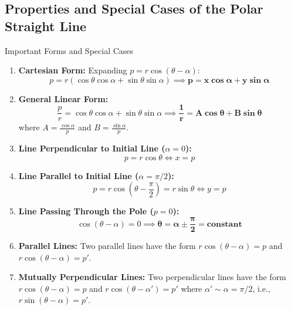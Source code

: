 \documentclass[11pt,a4paper]{article}
\begin{document}
\newpage

\subsection{Properties and Special Cases of the Polar Straight Line}

\begin{formulabox}{Important Forms and Special Cases}
\begin{enumerate}
    \item \textbf{Cartesian Form:} Expanding $p = r\cos(\theta - \alpha)$:
    \begin{equation}
        p = r(\cos\theta\cos\alpha + \sin\theta\sin\alpha) \implies \mathbf{p = x\cos\alpha + y\sin\alpha}
    \end{equation}
    
    \item \textbf{General Linear Form:}
    \begin{equation}
        \frac{p}{r} = \cos\theta\cos\alpha + \sin\theta\sin\alpha \implies \mathbf{\frac{1}{r} = A\cos\theta + B\sin\theta}
    \end{equation}
    where $A = \frac{\cos\alpha}{p}$ and $B = \frac{\sin\alpha}{p}$.
    
    \item \textbf{Line Perpendicular to Initial Line ($\alpha = 0$):}
    \begin{equation}
        p = r\cos\theta \iff x = p
    \end{equation}
    
    \item \textbf{Line Parallel to Initial Line ($\alpha = \pi/2$):}
    \begin{equation}
        p = r\cos\left(\theta - \frac{\pi}{2}\right) = r\sin\theta \iff y = p
    \end{equation}
    
    \item \textbf{Line Passing Through the Pole ($p = 0$):}
    \begin{equation}
        \cos(\theta - \alpha) = 0 \implies \mathbf{\theta = \alpha \pm \frac{\pi}{2} = \text{constant}}
    \end{equation}
    
    \item \textbf{Parallel Lines:} Two parallel lines have the form $r\cos(\theta - \alpha) = p$ and $r\cos(\theta - \alpha) = p'$.
    
    \item \textbf{Mutually Perpendicular Lines:} Two perpendicular lines have the form $r\cos(\theta - \alpha) = p$ and $r\cos(\theta - \alpha') = p'$ where $\alpha' \sim \alpha = \pi/2$, i.e., $r\sin(\theta - \alpha) = p'$.
\end{enumerate}
\end{formulabox}
\end{document}
